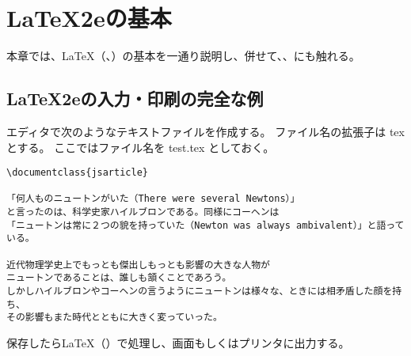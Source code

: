 \chapter{\LaTeX2e{}の基本}
本章では、\LaTeX（\LaTeXe、\pLaTeXe）の基本を一通り説明し、併せて\upLaTeX、\XeLaTeX、\LuaLaTeX{}にも触れる。
\section{\LaTeX2e{}の入力・印刷の完全な例}
エディタで次のようなテキストファイルを作成する。
ファイル名の拡張子は tex とする。
ここではファイル名を test.tex としておく。
\begin{mdframed}[roundcorner=0.50zw,leftmargin=3.00zw,rightmargin=3.00zw,skipabove=0.40zw,skipbelow=0.40zw,innertopmargin=4.00pt,innerbottommargin=4.00pt,innerleftmargin=5.00pt,innerrightmargin=5.00pt,linecolor=gray!020,linewidth=0.50pt,backgroundcolor=gray!20]
\begin{verbatim}
\documentclass{jsarticle}

「何人ものニュートンがいた（There were several Newtons）」
と言ったのは、科学史家ハイルブロンである。同様にコーヘンは
「ニュートンは常に２つの貌を持っていた（Newton was always ambivalent）」と語っている。

近代物理学史上でもっとも傑出しもっとも影響の大きな人物が
ニュートンであることは、誰しも頷くことであろう。
しかしハイルブロンやコーヘンの言うようにニュートンは様々な、ときには相矛盾した顔を持ち、
その影響もまた時代とともに大きく変っていった。

\end{verbatim}
\end{mdframed}
保存したら\LaTeX（\pLaTeXe）で処理し、画面もしくはプリンタに出力する。\\

